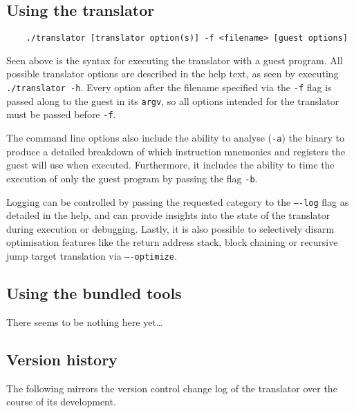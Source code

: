 \subsection{Using the translator}
\label{sec:translator-usage}
\begin{lstlisting}
	./translator [translator option(s)] -f <filename> [guest options]
\end{lstlisting}

Seen above is the syntax for executing the translator with a guest program.
All possible translator options are described in the help text, as seen by executing \texttt{./translator -h}.
Every option after the filename specified via the \texttt{-f} flag is passed along to the guest in its \texttt{argv}, so all options intended for the translator must be passed before \texttt{-f}.

The command line options also include the ability to analyse (\texttt{-a}) the binary to produce a detailed breakdown of which instruction mnemonics and registers the guest will use when executed.
Furthermore, it includes the ability to time the execution of only the guest program by passing the flag \texttt{-b}.

Logging can be controlled by passing the requested category to the \texttt{----log} flag as detailed in the help, and can provide insights into the state of the translator during execution or debugging.
Lastly, it is also possible to selectively disarm optimisation features like the return address stack, block chaining or recursive jump target translation via \texttt{----optimize}.


\subsection{Using the bundled tools}
There seems to be nothing here yet\ldots


\subsection{Version history}
The following mirrors the version control change log of the translator over the course of its development.

